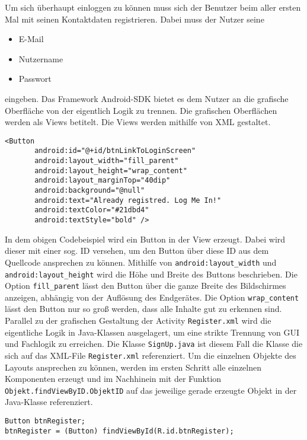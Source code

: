 Um sich überhaupt einloggen zu können muss sich der Benutzer beim aller ersten Mal  mit seinen Kontaktdaten registrieren. Dabei muss der Nutzer seine 
\begin{itemize}
	\item{E-Mail}
	\item{Nutzername}
	\item{Passwort}
\end{itemize}
eingeben.
Das Framework Android-SDK bietet es dem Nutzer an die grafische Oberfläche von der eigentlich Logik zu trennen. Die grafischen Oberflächen werden als Views betitelt. Die Views werden mithilfe von XML gestaltet.
\begin{lstlisting}[caption={Android - Button erstellen},captionpos=b]
<Button
       android:id="@+id/btnLinkToLoginScreen"
       android:layout_width="fill_parent"
       android:layout_height="wrap_content"
       android:layout_marginTop="40dip"
       android:background="@null"
       android:text="Already registred. Log Me In!"
       android:textColor="#21dbd4"
       android:textStyle="bold" />
\end{lstlisting}
In dem obigen Codebeispiel wird ein Button in der View erzeugt. Dabei wird dieser mit einer sog. ID versehen, um den Button über diese ID aus dem Quellcode ansprechen zu können. Mithilfe von \texttt{android:layout\_width} und \texttt{android:layout\_height} wird die Höhe und Breite des Buttons beschrieben. Die Option \texttt{fill\_parent} lässt den Button über die ganze Breite des Bildschirmes anzeigen, abhängig von der Auflösung des Endgerätes. Die Option \texttt{wrap\_content} lässt den Button nur so groß werden, dass alle Inhalte gut zu erkennen sind.
\\
Parallel zu der grafischen Gestaltung der Activity \texttt{Register.xml} wird die eigentliche Logik in Java-Klassen ausgelagert, um eine strikte Trennung von GUI und Fachlogik zu erreichen. Die Klasse \texttt{SignUp.java} ist diesem Fall die Klasse die sich auf das XML-File \texttt{Register.xml} referenziert. Um die einzelnen Objekte des Layouts ansprechen zu können, werden im ersten Schritt alle einzelnen Komponenten erzeugt und im Nachhinein mit der Funktion \texttt{Objekt.findViewByID.ObjektID} auf das jeweilige gerade erzeugte Objekt in der Java-Klasse referenziert.
\begin{lstlisting}[caption={Objekt Erzeugung und Referenzierung},captionpos=b]
Button btnRegister;
btnRegister = (Button) findViewById(R.id.btnRegister);
\end{lstlisting}
